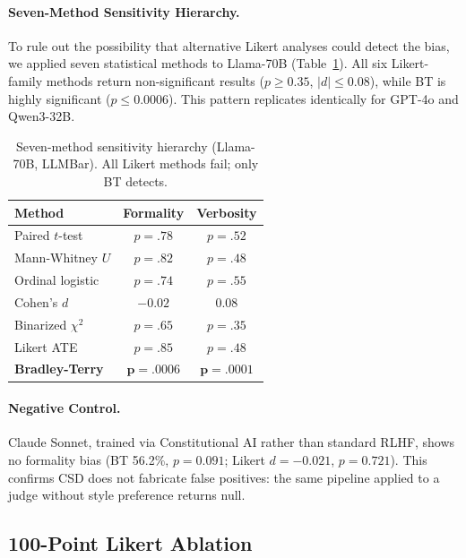 \documentclass[11pt,twocolumn]{article}
\begin{document}
\paragraph{Seven-Method Sensitivity Hierarchy.}
To rule out the possibility that alternative Likert analyses could detect the bias, we applied seven statistical methods to Llama-70B (Table~\ref{tab:7method}). All six Likert-family methods return non-significant results ($p \geq 0.35$, $|d| \leq 0.08$), while BT is highly significant ($p \leq 0.0006$). This pattern replicates identically for GPT-4o and Qwen3-32B.

\begin{table}[t]
\centering
\small
\caption{Seven-method sensitivity hierarchy (Llama-70B, LLMBar). All Likert methods fail; only BT detects.}
\label{tab:7method}
\begin{tabular}{@{}lcc@{}}
\toprule
Method & Formality & Verbosity \\
\midrule
Paired $t$-test & $p{=}.78$ & $p{=}.52$ \\
Mann-Whitney $U$ & $p{=}.82$ & $p{=}.48$ \\
Ordinal logistic & $p{=}.74$ & $p{=}.55$ \\
Cohen's $d$ & $-0.02$ & $0.08$ \\
Binarized $\chi^2$ & $p{=}.65$ & $p{=}.35$ \\
Likert ATE & $p{=}.85$ & $p{=}.48$ \\
\midrule
\textbf{Bradley-Terry} & $\mathbf{p{=}.0006}$ & $\mathbf{p{=}.0001}$ \\
\bottomrule
\end{tabular}
\vspace{-2mm}
\end{table}

\paragraph{Negative Control.}
Claude Sonnet, trained via Constitutional AI rather than standard RLHF, shows no formality bias (BT 56.2\%, $p = 0.091$; Likert $d = -0.021$, $p = 0.721$). This confirms CSD does not fabricate false positives: the same pipeline applied to a judge without style preference returns null.

\subsection{100-Point Likert Ablation}
\label{sec:100pt}
\end{document}
